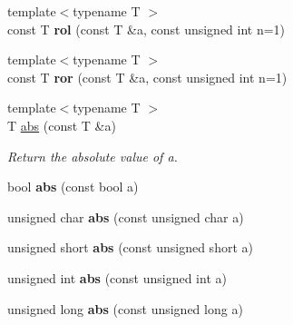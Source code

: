 \begin{DoxyCompactItemize}
\item 
\hypertarget{namespacecimg__library_1_1cimg_a60d87b4281175b0f935efc62769c1246}{{\footnotesize template$<$typename T $>$ }\\const T {\bfseries rol} (const T \&a, const unsigned int n=1)}\label{namespacecimg__library_1_1cimg_a60d87b4281175b0f935efc62769c1246}

\item 
\hypertarget{namespacecimg__library_1_1cimg_a0c60e777706d536a7729afd7df08e2f8}{{\footnotesize template$<$typename T $>$ }\\const T {\bfseries ror} (const T \&a, const unsigned int n=1)}\label{namespacecimg__library_1_1cimg_a0c60e777706d536a7729afd7df08e2f8}

\item 
\hypertarget{namespacecimg__library_1_1cimg_a94c6e14129933f3c261ccf9de7a6f299}{{\footnotesize template$<$typename T $>$ }\\T \hyperlink{namespacecimg__library_1_1cimg_a94c6e14129933f3c261ccf9de7a6f299}{abs} (const T \&a)}\label{namespacecimg__library_1_1cimg_a94c6e14129933f3c261ccf9de7a6f299}

\begin{DoxyCompactList}\small\item\em Return the absolute value of {\ttfamily a}. \end{DoxyCompactList}\item 
\hypertarget{namespacecimg__library_1_1cimg_af5f808f6fa9ca3ad976c23afe87435c3}{bool {\bfseries abs} (const bool a)}\label{namespacecimg__library_1_1cimg_af5f808f6fa9ca3ad976c23afe87435c3}

\item 
\hypertarget{namespacecimg__library_1_1cimg_aea32f4d823641a7d99b8553877ea5fc3}{unsigned char {\bfseries abs} (const unsigned char a)}\label{namespacecimg__library_1_1cimg_aea32f4d823641a7d99b8553877ea5fc3}

\item 
\hypertarget{namespacecimg__library_1_1cimg_acf4a4407c0e89381169790b5edd98732}{unsigned short {\bfseries abs} (const unsigned short a)}\label{namespacecimg__library_1_1cimg_acf4a4407c0e89381169790b5edd98732}

\item 
\hypertarget{namespacecimg__library_1_1cimg_aa8ae68e58f43a0fd423572cf3fe838cf}{unsigned int {\bfseries abs} (const unsigned int a)}\label{namespacecimg__library_1_1cimg_aa8ae68e58f43a0fd423572cf3fe838cf}

\item 
\hypertarget{namespacecimg__library_1_1cimg_a1ba51680474f99a17e20b757a31001e6}{unsigned long {\bfseries abs} (const unsigned long a)}\label{namespacecimg__library_1_1cimg_a1ba51680474f99a17e20b757a31001e6}


\end{DoxyCompactItemize}

